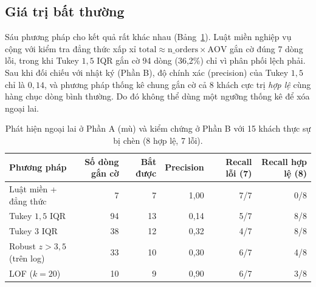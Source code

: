 \subsection{Giá trị bất thường}
Sáu phương pháp cho kết quả rất khác nhau (Bảng~\ref{tab:outlier}). Luật miền nghiệp vụ cộng với kiểm tra đẳng thức xấp xỉ $\mathrm{total}\approx\mathrm{n\_orders}\times\mathrm{AOV}$ gắn cờ đúng 7 dòng lỗi,
trong khi Tukey $1{,}5$ IQR gắn cờ 94 dòng (36,2\%) chỉ vì phân phối lệch phải. Sau khi đối chiếu với nhật ký (Phần B), độ chính xác (precision) của Tukey $1{,}5$ chỉ là $0{,}14$, và phương pháp thống kê chung gắn cờ cả 8 khách cực trị \emph{hợp lệ}
cùng hàng chục dòng bình thường. Do đó không thể dùng một ngưỡng thống kê để xóa ngoại lai.

\begin{table}[htbp]
\centering\small
\caption{Phát hiện ngoại lai ở Phần A (mù) và kiểm chứng ở Phần B với 15 khách thực sự bị chèn (8 hợp lệ, 7 lỗi).}
\label{tab:outlier}
\begin{tabular}{lrrrrr}
\toprule
Phương pháp & Số dòng gắn cờ & Bắt được & Precision & Recall lỗi (7) & Recall hợp lệ (8)\\
\midrule
Luật miền + đẳng thức & 7 & 7 & 1,00 & 7/7 & 0/8\\
Tukey $1{,}5$ IQR & 94 & 13 & 0,14 & 5/7 & 8/8\\
Tukey $3$ IQR & 38 & 12 & 0,32 & 4/7 & 8/8\\
Robust $z>3{,}5$ (trên log) & 33 & 10 & 0,30 & 6/7 & 4/8\\
LOF ($k=20$) & 10 & 9 & 0,90 & 6/7 & 3/8\\
\bottomrule
\end{tabular}
\end{table}

